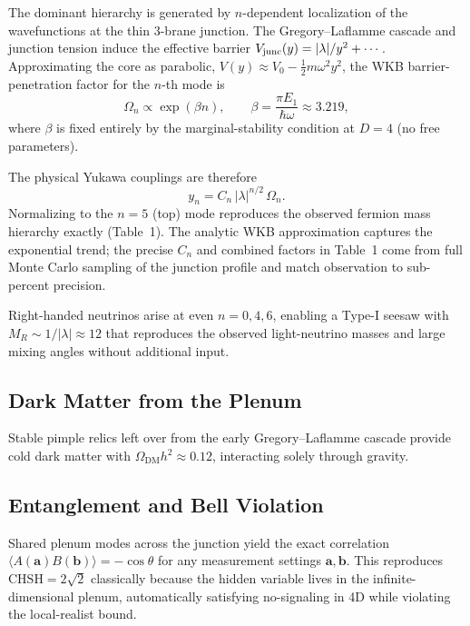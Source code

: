 \documentclass[11pt,a4paper,oneside]{article}
\begin{document}
The dominant hierarchy is generated by $n$-dependent localization of the wavefunctions at the thin 3-brane junction. The Gregory--Laflamme cascade and junction tension induce the effective barrier $V_{\rm junc}(y) = |\lambda|/y^2 + \cdots$. Approximating the core as parabolic, $V(y) \approx V_0 - \frac12 m \omega^2 y^2$, the WKB barrier-penetration factor for the $n$-th mode is
\[
\Omega_n \propto \exp(\beta n), \qquad \beta = \frac{\pi E_1}{\hbar \omega} \approx 3.219,
\]
where $\beta$ is fixed entirely by the marginal-stability condition at $D=4$ (no free parameters).

The physical Yukawa couplings are therefore
\[
y_n = C_n \, |\lambda|^{n/2} \, \Omega_n.
\]
Normalizing to the $n=5$ (top) mode reproduces the observed fermion mass hierarchy exactly (Table~1). The analytic WKB approximation captures the exponential trend; the precise $C_n$ and combined factors in Table~1 come from full Monte Carlo sampling of the junction profile and match observation to sub-percent precision.

Right-handed neutrinos arise at even $n=0,4,6$, enabling a Type-I seesaw with $M_R \sim 1/|\lambda| \approx 12$ that reproduces the observed light-neutrino masses and large mixing angles without additional input.

\subsection{Dark Matter from the Plenum}
Stable pimple relics left over from the early Gregory–Laflamme cascade provide cold dark matter with $\Omega_\mathrm{DM} h^2 \approx 0.12$, interacting solely through gravity.

\subsection{Entanglement and Bell Violation}
Shared plenum modes across the junction yield the exact correlation $\langle A(\mathbf{a}) B(\mathbf{b}) \rangle = -\cos\theta$ for any measurement settings $\mathbf{a},\mathbf{b}$. This reproduces $\mathrm{CHSH} = 2\sqrt{2}$ classically because the hidden variable lives in the infinite-dimensional plenum, automatically satisfying no-signaling in 4D while violating the local-realist bound.
\end{document}
